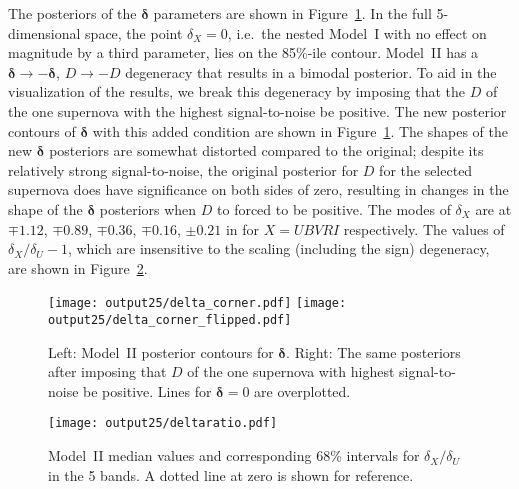 \documentclass{aastex61}   	%
\begin{document}
The posteriors of the $\pmb{\delta}$ parameters are shown  in
Figure~\ref{deltacorner:fig}.
In the full 5-dimensional space,
the point $\delta_X=0$, i.e.\ the nested Model~I with no effect on magnitude by a third parameter,  lies on the 85\%-ile contour.
Model~II has a  $\pmb{\delta} \rightarrow -\pmb{\delta}$, $D \rightarrow -D$ degeneracy that results in a bimodal posterior.
To aid in the visualization of the results,
we break this degeneracy by imposing  that the $D$ of the one supernova with the highest signal-to-noise be positive.
The new posterior contours of $\pmb{\delta}$ with this added
condition are shown in Figure~\ref{deltacorner:fig}.
The shapes of the new $\pmb{\delta}$ posteriors are somewhat distorted compared to the original;
despite its relatively strong signal-to-noise, the original posterior for $D$ for the selected supernova does have significance on both sides of zero,
resulting in changes in the shape of the $\pmb{\delta}$ posteriors when  $D$ to forced to be positive.   
The modes of $\delta_X$ are at $\mp 1.12$, $\mp 0.89$, $\mp 0.36$,  $\mp0.16$, $\pm0.21$ in for $X=UBVRI$ respectively.
The values of $\delta_X/\delta_U-1$, which are insensitive to the scaling (including the sign) degeneracy, are shown in Figure~\ref{deltaratio:fig}.

\begin{figure}[htbp] %
   \centering
   \texttt{[image: output25/delta\_corner.pdf]}
     \texttt{[image: output25/delta\_corner\_flipped.pdf]}
   \caption{Left:  Model~II posterior contours for $\pmb{\delta}$.
   Right: The same posteriors after imposing that $D$ of the one supernova with highest signal-to-noise be positive.
     Lines for $\pmb{\delta}=0$ are overplotted.
   \label{deltacorner:fig}}
\end{figure}


\begin{figure}[htbp] %
   \centering
      \texttt{[image: output25/deltaratio.pdf]}
   \caption{Model~II median values  and corresponding 68\% intervals for $\delta_X/\delta_U$ in the 5 bands.
   A dotted line at zero is shown for reference.
   \label{deltaratio:fig}}
\end{figure}



\end{document}
